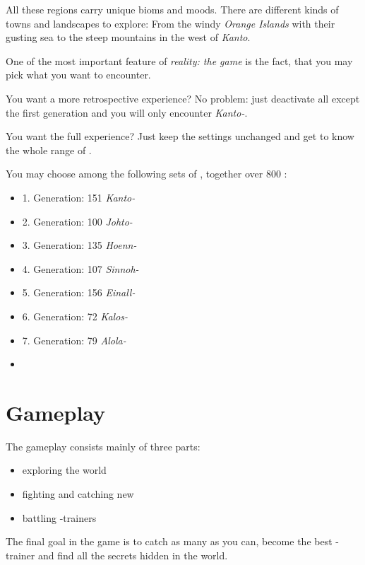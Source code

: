 All these regions carry unique bioms and moods. There are different kinds of towns and landscapes to explore: From the windy \emph{Orange Islands} with their gusting sea to the steep mountains in the west of \emph{Kanto}.

One of the most important feature of \emph{\poke{} reality: the game} is the fact, that you may pick what \poke{} you want to encounter. 

You want a more retrospective experience? No problem: just deactivate all \poke{} except the first generation and you will only encounter \emph{Kanto-\poke{}}.

You want the full experience? Just keep the settings unchanged and get to know the whole range of \poke{}.

You may choose among the following sets of \poke{}, together over 800 \poke{}:
\begin{multicols}{2}
\begin{itemize}
\item 1. Generation: 151 \emph{Kanto-\pokeT}
\item 2. Generation: 100 \emph{Johto-\pokeT}
\item 3. Generation: 135 \emph{Hoenn-\pokeT}
\item 4. Generation: 107 \emph{Sinnoh-\pokeT}
\item 5. Generation: 156 \emph{Einall-\pokeT}
\item 6. Generation: 72 \emph{Kalos-\pokeT}
\item 7. Generation: 79 \emph{Alola-\pokeT}
\item[]
\end{itemize}
\end{multicols}

\section{Gameplay}

The gameplay consists mainly of three parts:
\begin{itemize}
\item exploring the world
\item fighting and catching new \poke{}
\item battling \poke{}-trainers
\end{itemize}

The final goal in the game is to catch as many \poke{} as you can, become the best \poke{}-trainer and find all the secrets hidden in the world.

